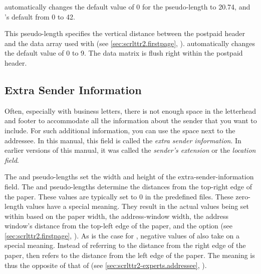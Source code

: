 \KOMAScript{} automatically changes the default value of
0 for the  pseudo-length to 20.74, and
's default from 0 to 42.%
%
\EndIndexGroup


\begin{Declaration}
\end{Declaration}
This pseudo-length specifies the vertical
distance between the postpaid header and the data array used with
%
%
 (see \autoref{sec:scrlttr2.firstpage},
). \KOMAScript{}
automatically changes the default value of 0 to 9. The data
matrix is flush right within the postpaid header.%
\EndIndexGroup
%
\EndIndexGroup


\subsection{Extra Sender Information}
\BeginIndexGroup
{}

Often, especially with business letters, there is not enough space in the
letterhead and footer to accommodate all the information about the sender that
you want to include. For such additional information, you can use the space
next to the addressee. In this manual, this field is called the
\emph{extra sender information}. In earlier versions of this manual, it
was called the \emph{sender's extension} or the \emph{location field}.

\begin{Declaration}
\end{Declaration}
The  and
 pseudo-lengths set the
width and height of the extra-sender-information field. The 
and  pseudo-lengths determine the distances from the
top-right edge of the paper. These values are typically set to 0 in
the predefined  files. These zero-length values
have a special meaning. They result in the actual values being set within
 based on the paper width, the address-window
width, the address window's distance from the top-left edge of the paper, and
the  option (see
\autoref{sec:scrlttr2.firstpage}, ). As
is the case for , negative values of 
also take on a special meaning. Instead of referring to the distance from the
right edge of the paper,  then refers to the distance from
the left edge of the paper. The meaning is thus the opposite of that of
 (see \autoref{sec:scrlttr2-experts.addressee},
).%
\EndIndexGroup
%
\EndIndexGroup


